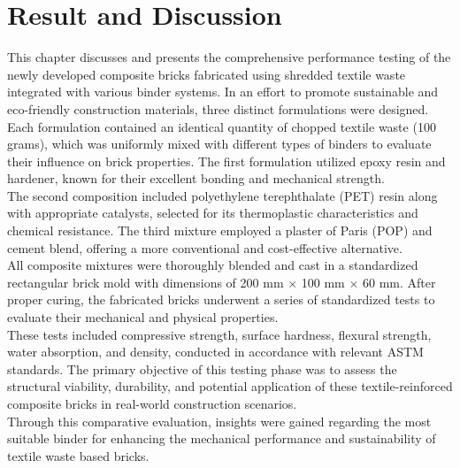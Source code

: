 \chapter{Result and Discussion}
This chapter discusses and presents the comprehensive performance testing of the newly developed composite bricks fabricated using shredded textile waste integrated with various binder systems. In an effort to promote sustainable and eco-friendly construction materials, three distinct formulations were designed. Each formulation contained an identical quantity of chopped textile waste (100 grams), which was uniformly mixed with different types of binders to evaluate their influence on brick properties.  The first formulation utilized epoxy resin and hardener, known for their excellent bonding and mechanical strength. \\

\noindent The second composition included polyethylene terephthalate (PET) resin along with appropriate catalysts, selected for its thermoplastic characteristics and chemical resistance. The third mixture employed a plaster of Paris (POP) and cement blend, offering a more conventional and cost-effective alternative. \\

\noindent All composite mixtures were thoroughly blended and cast in a standardized rectangular brick mold with dimensions of 200 mm $\times$ 100 mm $\times$ 60 mm. After proper curing, the fabricated bricks underwent a series of standardized tests to evaluate their mechanical and physical properties.  \\

\noindent These tests included compressive strength, surface hardness, flexural strength, water absorption, and density, conducted in accordance with relevant ASTM standards. The primary objective of this testing phase was to assess the structural viability, durability, and potential application of these textile-reinforced composite bricks in real-world construction scenarios. \\

\noindent Through this comparative evaluation, insights were gained regarding the most suitable binder for enhancing the mechanical performance and sustainability of textile waste based bricks.





